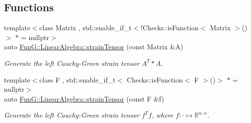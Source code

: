 \subsection*{\-Functions}
\begin{DoxyCompactItemize}
\item 
{\footnotesize template$<$class Matrix , std\-::enable\-\_\-if\-\_\-t$<$!\-Checks\-::is\-Function$<$ Matrix $>$()$>$ $\ast$  = nullptr$>$ }\\auto \hyperlink{namespaceFunG_1_1LinearAlgebra_a0e10030a723fad88f5f4f0b6612c393a}{\-Fun\-G\-::\-Linear\-Algebra\-::strain\-Tensor} (const \-Matrix \&\-A)
\begin{DoxyCompactList}\small\item\em \-Generate the left \-Cauchy-\/\-Green strain tensor $A^T*A$. \end{DoxyCompactList}\item 
{\footnotesize template$<$class F , std\-::enable\-\_\-if\-\_\-t$<$ Checks\-::is\-Function$<$ F $>$()$>$ $\ast$  = nullptr$>$ }\\auto \hyperlink{namespaceFunG_1_1LinearAlgebra_ab4371788da401ca62a3a29a13cf8d4ce}{\-Fun\-G\-::\-Linear\-Algebra\-::strain\-Tensor} (const \-F \&f)
\begin{DoxyCompactList}\small\item\em \-Generate the left \-Cauchy-\/\-Green strain tensor $f^Tf$, where $f:\cdot\mapsto\mathbb{R}^{n,n} $. \end{DoxyCompactList}\end{DoxyCompactItemize}
